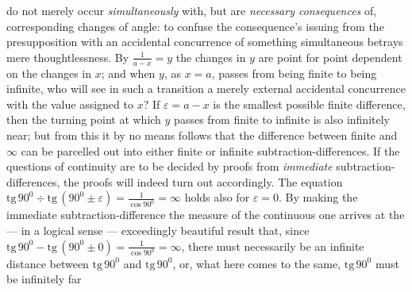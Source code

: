 \documentclass[12pt,a4paper]{book}
\begin{document}
do not merely occur \emph{simultaneously} with, but are \emph{necessary
consequences} of, corresponding changes of angle: to confuse the consequence's
issuing from the presupposition with an accidental concurrence of something
simultaneous betrays mere thoughtlessness. By $\frac{1}{a-x} = y$ the changes
in $y$ are point for point dependent on the changes in $x$; and when $y$, as
$x = a$, passes from being finite to being infinite, who will see in such a
transition a merely external accidental concurrence with the value assigned to
$x$? If $\varepsilon = a - x$ is the smallest possible finite difference, then
the turning point at which $y$ passes from finite to infinite is also
infinitely near; but from this it by no means follows that the difference
between finite and $\infty$ can be parcelled out into either finite or infinite
subtraction-differences. If the questions of continuity are to be decided by
proofs from \emph{immediate} subtraction-differences, the proofs will indeed
turn out accordingly. The equation
$\mathrm{tg}\,90^{0} \div \mathrm{tg}\,(90^{0} \pm \varepsilon) =
\frac{1}{\cos 90^{0}} = \infty$
\setcounter{footnote}{0}
holds also for $\varepsilon = 0$. By making the immediate subtraction-difference
the measure of the continuous one arrives at the --- in a logical sense ---
exceedingly beautiful result that, since
$\mathrm{tg}\,90^{0} - \mathrm{tg}\,(90^{0} \pm 0) =
\frac{1}{\cos 90^{0}} = \infty$, there must necessarily be an infinite distance
between $\mathrm{tg}\,90^{0}$ and $\mathrm{tg}\,90^{0}$, or, what here comes to
the same, $\mathrm{tg}\,90^{0}$ must be infinitely far
\end{document}
